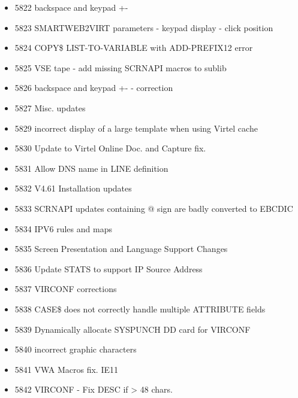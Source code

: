 \documentclass[letterpaper,10pt,english]{sphinxmanual}
\begin{document}
\begin{itemize}
\item {} 
5822 backspace and keypad +-

\item {} 
5823 SMARTWEB2VIRT parameters - keypad display - click position

\item {} 
5824 COPY\$ LIST-TO-VARIABLE with ADD-PREFIX12 error

\item {} 
5825 VSE tape - add missing SCRNAPI macros to sublib

\item {} 
5826 backspace and keypad +- - correction

\item {} 
5827 Misc. updates

\item {} 
5829 incorrect display of a large template when using Virtel cache

\item {} 
5830 Update to Virtel Online Doc. and Capture fix.

\item {} 
5831 Allow DNS name in LINE definition

\item {} 
5832 V4.61 Installation updates

\item {} 
5833 SCRNAPI updates containing @ sign are badly converted to EBCDIC

\item {} 
5834 IPV6 rules and maps

\item {} 
5835 Screen Presentation and Language Support Changes

\item {} 
5836 Update STATS to support IP Source Address

\item {} 
5837 VIRCONF corrections

\item {} 
5838 CASE\$ does not correctly handle multiple ATTRIBUTE fields

\item {} 
5839 Dynamically allocate SYSPUNCH DD card for VIRCONF

\item {} 
5840 incorrect graphic characters

\item {} 
5841 VWA Macros fix. IE11

\item {} 
5842 VIRCONF - Fix DESC if \textgreater{} 48 chars.


\end{itemize}
\end{document}
